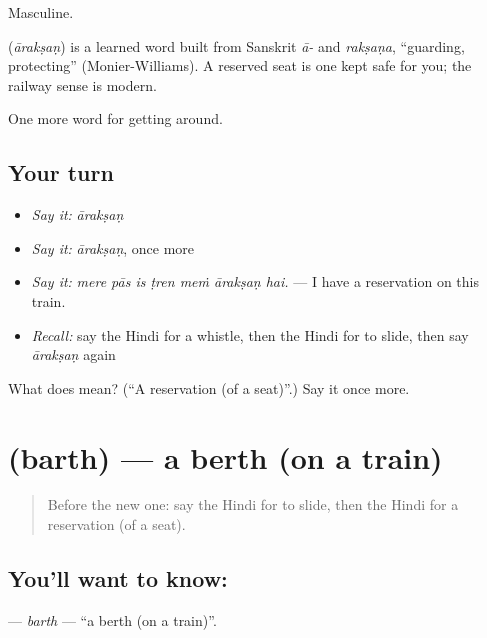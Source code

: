 Masculine.

\begin{cousinweb}
\textbf{} (\emph{ārakṣaṇ}) is a learned word built from Sanskrit \emph{ā-} and \emph{rakṣaṇa}, \textquotedblleft{}guarding, protecting\textquotedblright{} (Monier-Williams). A reserved seat is one kept safe for you; the railway sense is modern.
\end{cousinweb}

\begin{grammarlens}[title={What you've built}]
One more word for getting around.
\end{grammarlens}

\subsection*{Your turn}
\begin{itemize}
\raggedright
  \item \emph{Say it:} \emph{ārakṣaṇ}
  \item \emph{Say it:} \emph{ārakṣaṇ}, once more
  \item \emph{Say it:} \emph{mere pās is ṭren meṁ ārakṣaṇ hai.} — I have a reservation on this train.
  \item \emph{Recall:} say the Hindi for a whistle, then the Hindi for to slide, then say \emph{ārakṣaṇ} again
\end{itemize}

\begin{tcolorbox}[breakable,colback=teal!4,colframe=teal!35!black,title={Before you move on}]
What does  mean? (\textquotedblleft{}A reservation (of a seat)\textquotedblright{}.) Say it once more.
\end{tcolorbox}
\section[\texorpdfstring{\hi{बर्थ} (barth)}{बर्थ (barth)}]{ (barth) — a berth (on a train)}

\label{lesson:HI-C400-barth}



\begin{quote}
Before the new one: say the Hindi for to slide, then the Hindi for a reservation (of a seat).
\end{quote}

\subsection*{You'll want to know: }
\textbf{} — \emph{barth} — \textquotedblleft{}a berth (on a train)\textquotedblright{}.

